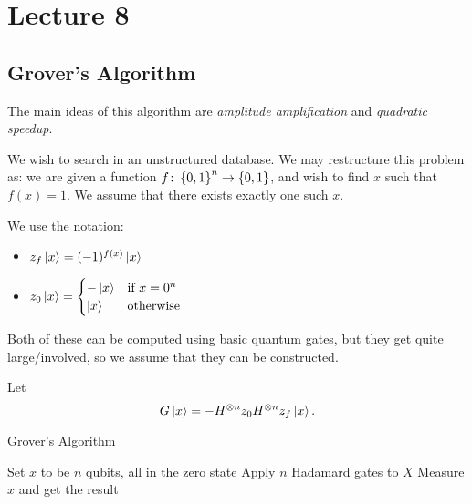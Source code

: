 \documentclass[class=article, crop=false]{standalone}
\begin{document}
  \section{Lecture 8}
  \subsection{Grover's Algorithm}
  The main ideas of this algorithm are \emph{amplitude amplification} and \emph{quadratic speedup}. \par
  We wish to search in an unstructured database. We may restructure this problem as: we are given a function $f\colon \left\{0, 1\right\}^n\to \left\{0, 1\right\}$, and wish to find $x$ such that $f(x) = 1$. We assume that there exists exactly one such $x$. \par
  We use the notation:
  \begin{itemize}
    \item $z_f\left\lvert x \right\rangle = (-1)^{f(x)}\left\lvert x \right\rangle$
    \item $z_0\left\lvert x \right\rangle = \begin{cases}
      -\left\lvert x \right\rangle & \text{if }x = 0^n \\
      \left\lvert x \right\rangle & \text{otherwise}
    \end{cases}$
  \end{itemize}
  \begin{note}{}
    Both of these can be computed using basic quantum gates, but they get quite large/involved, so we assume that they can be constructed.
  \end{note}
  Let
  \[
    G\left\lvert x \right\rangle = -H^{\otimes n}z_0H^{\otimes n}z_f\left\lvert x \right\rangle.
  \]
  \begin{algorithm}
    \DontPrintSemicolon
    \caption{Grover's Algorithm}
    Set $x$ to be $n$ qubits, all in the zero state\;
    Apply $n$ Hadamard gates to $X$\;
    Measure $x$ and get the result
  \end{algorithm}
\end{document}
